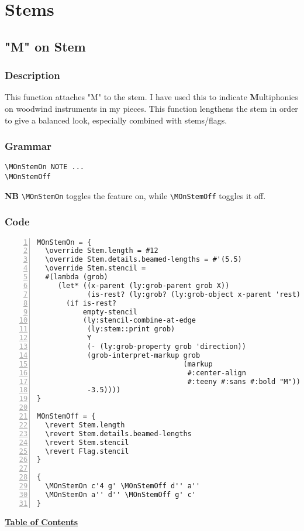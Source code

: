 
\chapter {Stems}


\section {"M" on Stem}
\hfill

\subsection{Description}
This function attaches "M" to the stem. I have used this to indicate \textbf{M}ultiphonics on woodwind instruments in my pieces. This function lengthens the stem in order to give a balanced look, especially combined with stems/flags. 
\subsection{Grammar}
\begin{verbatim}
\MOnStemOn NOTE ...
\MOnStemOff
\end{verbatim}
\textbf{NB} \verb |\MOnStemOn| toggles the feature on, while \verb|\MOnStemOff| toggles it off.

\subsection{Code}
\begin{Verbatim}[numbers=left,xleftmargin=5mm]
MOnStemOn = {
  \override Stem.length = #12
  \override Stem.details.beamed-lengths = #'(5.5)
  \override Stem.stencil =
  #(lambda (grob)
     (let* ((x-parent (ly:grob-parent grob X))
            (is-rest? (ly:grob? (ly:grob-object x-parent 'rest))))
       (if is-rest?
           empty-stencil
           (ly:stencil-combine-at-edge
            (ly:stem::print grob)
            Y
            (- (ly:grob-property grob 'direction))
            (grob-interpret-markup grob
                                   (markup
                                    #:center-align
                                    #:teeny #:sans #:bold "M"))
            -3.5))))
}

MOnStemOff = {
  \revert Stem.length
  \revert Stem.details.beamed-lengths
  \revert Stem.stencil
  \revert Flag.stencil
}

{
  \MOnStemOn c'4 g' \MOnStemOff d'' a''
  \MOnStemOn a'' d'' \MOnStemOff g' c'
}
\end{Verbatim}
\hyperref[sec:toc]{\textbf{Table of Contents}}

